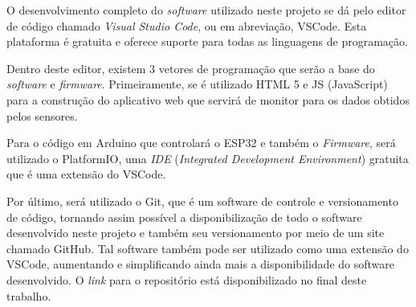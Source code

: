 O desenvolvimento completo do \textit{software} utilizado neste projeto se dá pelo editor de código chamado \textit{Visual Studio Code}, ou em abreviação, \gls{VSCode}. Esta plataforma é gratuita e oferece suporte para todas as linguagens de programação.

Dentro deste editor, existem 3 vetores de programação que serão a base do \textit{software} e \textit{firmware}. Primeiramente, se é utilizado \gls{HTML} 5 e \gls{JS} (JavaScript) para a construção do aplicativo web que servirá de monitor para os dados obtidos pelos sensores.

Para o código em Arduino que controlará o ESP32 e também o \textit{Firmware}, será utilizado o PlatformIO, uma \textit{\gls{IDE}} (\textit{Integrated Development Environment}) gratuita que é uma extensão do VSCode.

Por último, será utilizado o \gls{Git}, que é um software de controle e versionamento de código, tornando assim possível a disponibilização de todo o software desenvolvido neste projeto e também seu versionamento por meio de um site chamado \gls{GitHub}. Tal software também pode ser utilizado como uma extensão do VSCode, aumentando e simplificando ainda mais a disponibilidade do software desenvolvido. O \textit{link} para o repositório está disponibilizado no final deste trabalho.



